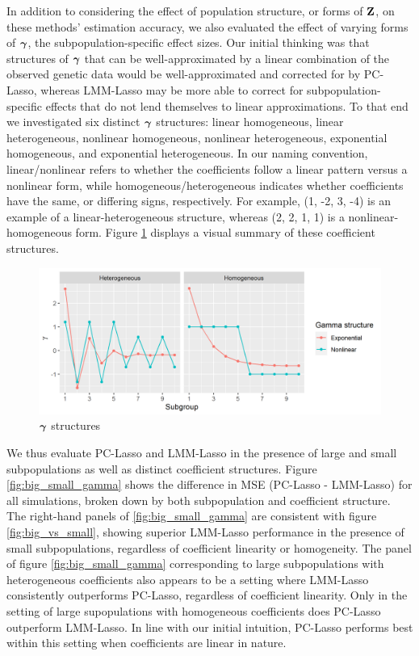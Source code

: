 In addition to considering the effect of population structure, or forms of $\textbf{Z}$, on these methods' estimation accuracy, we also evaluated the effect of varying forms of $\boldsymbol{\gamma}$, the subpopulation-specific effect sizes. Our initial thinking was that structures of $\boldsymbol{\gamma}$ that can be well-approximated by a linear combination of the observed genetic data would be well-approximated and corrected for by PC-Lasso, whereas LMM-Lasso may be more able to correct for subpopulation-specific effects that do not lend themselves to linear approximations. To that end we investigated six distinct $\boldsymbol{\gamma}$ structures: linear homogeneous, linear heterogeneous, nonlinear homogeneous, nonlinear heterogeneous, exponential homogeneous, and exponential heterogeneous. In our naming convention, linear/nonlinear refers to whether the coefficients follow a linear pattern versus a nonlinear form, while homogeneous/heterogeneous indicates whether coefficients have the same, or differing signs, respectively. For example, (1, -2, 3, -4) is an example of a linear-heterogeneous structure, whereas (2, 2, 1, 1) is a nonlinear-homogeneous form. Figure \ref{fig:gamma_structures} displays a visual summary of these coefficient structures. \\

\begin{figure}[H]
    \centering
    \includegraphics[scale = 0.9]{figures/gamma_structure.png}
    \caption{$\boldsymbol{\gamma}$ structures}
    \label{fig:gamma_structures}
\end{figure}

We thus evaluate PC-Lasso and LMM-Lasso in the presence of large and small subpopulations as well as distinct coefficient structures. Figure \ref{fig:big_small_gamma} shows the difference in MSE (PC-Lasso - LMM-Lasso) for all simulations, broken down by both subpopulation and coefficient structure. The right-hand panels of \ref{fig:big_small_gamma} are consistent with figure \ref{fig:big_vs_small}, showing superior LMM-Lasso performance in the presence of small subpopulations, regardless of coefficient linearity or homogeneity. The panel of figure \ref{fig:big_small_gamma} corresponding to large subpopulations with heterogeneous coefficients also appears to be a setting where LMM-Lasso consistently outperforms PC-Lasso, regardless of coefficient linearity. Only in the setting of large supopulations with homogeneous coefficients does PC-Lasso outperform LMM-Lasso. In line with our initial intuition, PC-Lasso performs best within this setting when coefficients are linear in nature. 

